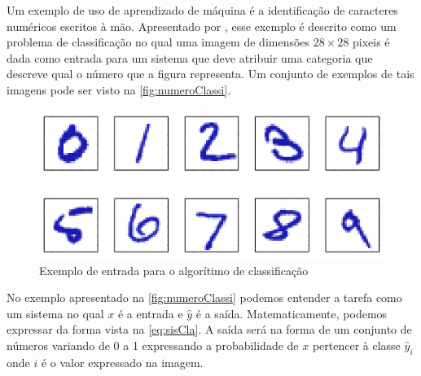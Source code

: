 \documentclass[
    12pt,
    oneside,
    a4paper,
    english,
    brazil
]{abntex2}
\begin{document}
Um exemplo de uso de aprendizado de máquina é a identificação de caracteres  numéricos escritos à mão. Apresentado por , esse exemplo é descrito como  um problema de  classificação no qual uma imagem  de dimensões $28 \times 28$ pixeis é dada como  entrada para um sistema que deve atribuir uma categoria que descreve qual o número que a figura representa.  Um conjunto de exemplos de tais imagens  pode ser  visto na \autoref{fig:numeroClassi}.

\begin{figure}[ht]
    \centering
    \caption{Exemplo de entrada para o algorítimo de
        classificação}\label{fig:numeroClassi}
    \includegraphics[width=.5\linewidth]{images/numeroClassificacao.png}
\end{figure}

No exemplo apresentado na \autoref{fig:numeroClassi} podemos entender a tarefa como um sistema no qual $x$  é a  entrada  e $\hat{y}$  é a  saída.
Matematicamente, podemos expressar da  forma vista  na \autoref{eq:sisCla}.  A saída será na forma  de um conjunto de números variando de 0  a 1 expressando a probabilidade  de  $x$ pertencer  à  classe  $\hat{y}_i$  onde  $i$ é o valor expressado na imagem.
\end{document}
